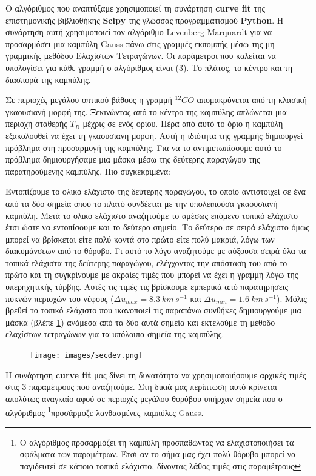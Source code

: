 \documentclass[a4paper,12pt]{memoir}
\begin{document}
Ο αλγόριθμος που αναπτύξαμε χρησιμοποιεί τη συνάρτηση \textbf{curve fit} της επιστημονικής βιβλιοθήκης \textbf{Scipy} της γλώσσας προγραμματισμού \textbf{Python}. Η συνάρτηση αυτή χρησιμοποιεί τον αλγόριθμο Levenberg-Marquardt για να προσαρμόσει μια καμπύλη Gauss πάνω στις γραμμές εκπομπής μέσω της μη γραμμικής μεθόδου Ελαχίστων Τετραγώνων. Οι παράμετροι που καλείται να υπολογίσει για κάθε γραμμή ο αλγόριθμος είναι (3). Το πλάτος, το κέντρο και τη διασπορά της καμπύλης.

Σε περιοχές μεγάλου οπτικού βάθους η γραμμή $^{12}CO$ απομακρύνεται από τη κλασική γκαουσιανή μορφή της. Ξεκινώντας από το κέντρο της καμπύλης απλώνεται μια περιοχή σταθερής $T_B$ μέχρις σε ενός ορίου. Πέρα από αυτό το όριο η καμπύλη εξακολουθεί να έχει τη γκαουσιανη μορφή. Αυτή η ιδιότητα της γραμμής δημιουργεί πρόβλημα στη προσαρμογή της καμπύλης. Για να το αντιμετωπίσουμε αυτό το πρόβλημα δημιουργήσαμε μια μάσκα μέσω της δεύτερης παραγώγου της παρατηρούμενης καμπύλης. Πιο συγκεκριμένα:

Εντοπίζουμε το ολικό ελάχιστο της δεύτερης παραγώγου, το οποίο αντιστοιχεί σε ένα από τα δύο σημεία όπου το πλατό συνδέεται με την υπολειπούσα γκαουσιανή καμπύλη. Μετά το ολικό ελάχιστο αναζητούμε το αμέσως επόμενο τοπικό ελάχιστο έτσι ώστε να εντοπίσουμε και το δεύτερο σημείο. 
Το δεύτερο σε σειρά ελάχιστο όμως μπορεί να βρίσκεται είτε πολύ κοντά στο πρώτο είτε πολύ μακριά, λόγω των διακυμάνσεων από το θόρυβο. 
Γι αυτό το λόγο αναζητούμε με αύξουσα σειρά όλα τα τοπικά ελάχιστα της δεύτερης παραγώγου, ελέγχοντας την απόσταση του από το πρώτο και τη συγκρίνουμε με ακραίες τιμές που μπορεί να έχει η γραμμή λόγω της υπερηχητικής τύρβης. Αυτές τις τιμές τις βρίσκουμε εμπερικά από παρατηρήσεις πυκνών περιοχών του νέφους ($\Delta u _{max}=8.3 \ km\, s^{-1}$ και $\Delta u _{min} =1.6 \ km\, s^{-1}$). 
Μόλις βρεθεί το τοπικό ελάχιστο που ικανοποιεί τις παραπάνω συνθήκες δημιουργούμε μια μάσκα (βλέπε \ref{fig:secdev}) ανάμεσα από τα δύο αυτά σημεία και εκτελούμε τη μέθοδο ελαχίστων τετραγώνων για τα υπόλοιπα σημεία της καμπύλης.

\begin{figure}[H]
	\label{fig:secdev}
	\centering
	\texttt{[image: images/secdev.png]}
	\caption{}
\end{figure}


Η συνάρτηση \textbf{curve fit} μας δίνει τη δυνατότητα να χρησιμοποιήσουμε αρχικές τιμές στις 3 παραμέτρους που αναζητούμε. Στη δικιά μας περίπτωση αυτό κρίνεται απολύτως αναγκαίο αφού σε περιοχές μεγάλου θορύβου υπήρχαν σημεία που ο αλγόριθμος \footnote{Ο αλγόριθμος προσαρμόζει τη καμπύλη προσπαθώντας να ελαχιστοποιήσει τα σφάλματα των παραμέτρων. Έτσι αν το σήμα μας έχει πολύ θόρυβο μπορεί να παγιδευτεί σε κάποιο τοπικό ελάχιστο, δίνοντας λάθος τιμές στις παραμέτρους}προσάρμοζε λανθασμένες καμπύλες Gauss. 
\end{document}
